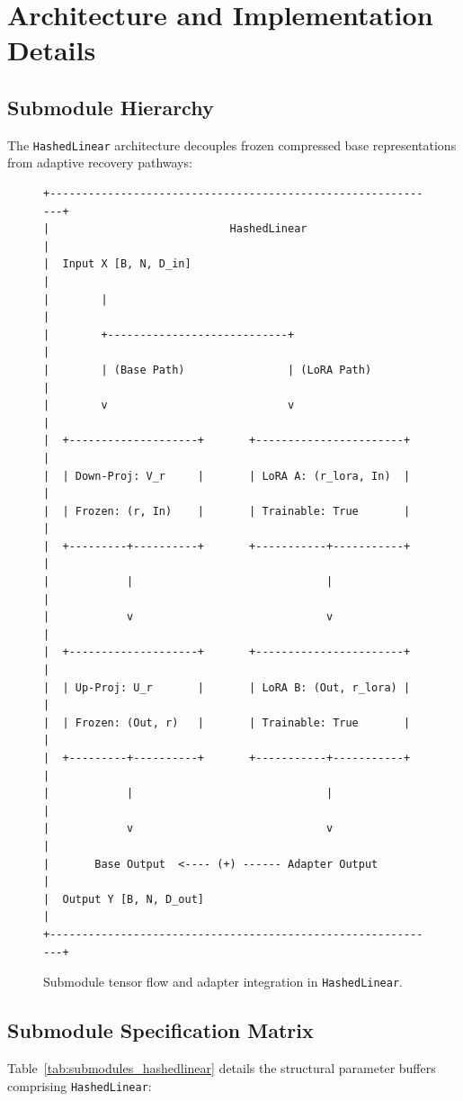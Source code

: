 \section{Architecture and Implementation Details}

\subsection{Submodule Hierarchy}
The \texttt{HashedLinear} architecture decouples frozen compressed base representations from adaptive recovery pathways:

\begin{figure}[H]
\centering
\begin{verbatim}
+-------------------------------------------------------------+
|                            HashedLinear                     |
|  Input X [B, N, D_in]                                       |
|        |                                                    |
|        +----------------------------+                       |
|        | (Base Path)                | (LoRA Path)           |
|        v                            v                       |
|  +--------------------+       +-----------------------+     |
|  | Down-Proj: V_r     |       | LoRA A: (r_lora, In)  |     |
|  | Frozen: (r, In)    |       | Trainable: True       |     |
|  +---------+----------+       +-----------+-----------+     |
|            |                              |                 |
|            v                              v                 |
|  +--------------------+       +-----------------------+     |
|  | Up-Proj: U_r       |       | LoRA B: (Out, r_lora) |     |
|  | Frozen: (Out, r)   |       | Trainable: True       |     |
|  +---------+----------+       +-----------+-----------+     |
|            |                              |                 |
|            v                              v                 |
|       Base Output  <---- (+) ------ Adapter Output          |
|  Output Y [B, N, D_out]                                     |
+-------------------------------------------------------------+
\end{verbatim}
\caption{Submodule tensor flow and adapter integration in \texttt{HashedLinear}.}
\end{figure}

\subsection{Submodule Specification Matrix}
Table~\ref{tab:submodules_hashedlinear} details the structural parameter buffers comprising \texttt{HashedLinear}:

